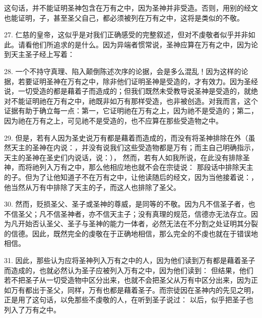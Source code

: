 这句话，并不能证明圣神包含在万有之中，因为圣神并非受造。否则，用别的经文也能证明，子，甚至圣父自己，都必须被列在万有之中，这将是类似的不敬。\par

27. 仁慈的皇帝，这似乎是对我们正确感受的完整叙述，但对不虔敬者似乎并非如此。请看他们所追求的是什么。因为异端者惯常说，圣神应算在万有之中，因为论到天主圣子经上写着：\par

28. 一个不持守真理、陷入颠倒陈述次序的论据，会是多么混乱！因为这样的论据，若要证明圣神在万有之中，除非他们证明圣神是受造的，才有效力。因为圣经说，一切受造的都是藉着子而造成的；但我们既然未受教导说圣神是受造的，就绝对不能证明祂在万有之中，祂既非如万有那样受造，也非被创造。对我而言，这个证据有助于确立每一点：第一，它证明祂在万有之上，因为祂不是受造的；第二，因为祂在万有之上，可见祂不是受造的，也不应算在那些受造物之中。\par

29. 但是，若有人因为圣史说万有都是藉着而造成的，而没有将圣神排除在外（虽然天主的圣神在内说：，并没有说我们这些受造物都是万有；而主自己明确指示，天主的圣神在圣史们内说话，说：）， 然而，若有人如我所说，在此没有排除圣神，而将祂列入万有之中，那么他相应地也就不会在宗徒说：  那段话中排除天主的子。但为了让他知道子不在万有之中，让他读随后的经文，因为当他接着说：， 他当然从万有中排除了天主的子，而这人也排除了圣父。\par

30. 然而，贬损圣父、圣子或圣神的尊威，是同等的不敬。因为凡不信圣子者，也不信圣父；凡不信圣神者，亦不信天主子；没有真理的规范，信德亦无法存立。因为凡开始否认圣父、圣子与圣神的能力一体者，必然无法在不分割之处证明其分裂的信德。因此，既然完全的虔敬在于正确地相信，那么完全的不虔也就在于错误地相信。\par

31. 因此，那些认为应将圣神列入万有之中的人，因为他们读到万有都是藉着圣子而造成的，也就必然认为圣子应被列入万有之中，因为他们读到： 但结果，他们若不把圣子从一切受造物中区分出来，也就不会把圣父从万有中区分出来，因为正如万有都出于圣父，同样，万有也都是藉着圣子。而宗徒因在圣神内的先见之明，正是用了这句话，以免那些不虔敬的人，在听到圣子说过： 以后，似乎把圣子也列入了万有之中。\par

